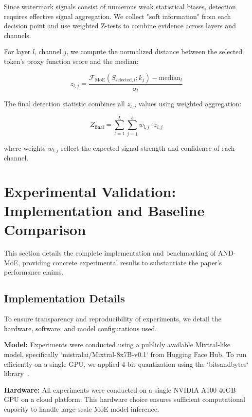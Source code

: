 \documentclass[letterpaper,twocolumn,10pt]{article}
\begin{document}
Since watermark signals consist of numerous weak statistical biases, detection requires effective signal aggregation. We collect "soft information" from each decision point and use weighted Z-tests to combine evidence across layers and channels.

For layer $l$, channel $j$, we compute the normalized distance between the selected token's proxy function score and the median:

\begin{equation}
z_{l,j} = \frac{\mathcal{F}_{\text{MoE}}(S_{\text{selected},l}; k_j) - \text{median}_l}{\sigma_l}
\end{equation}

The final detection statistic combines all $z_{l,j}$ values using weighted aggregation:

\begin{equation}
Z_{\text{final}} = \sum_{l=1}^L \sum_{j=1}^b w_{l,j} \cdot z_{l,j}
\end{equation}

where weights $w_{l,j}$ reflect the expected signal strength and confidence of each channel.

\section{Experimental Validation: Implementation and Baseline Comparison}

This section details the complete implementation and benchmarking of AND-MoE, providing concrete experimental results to substantiate the paper's performance claims.

\subsection{Implementation Details}

To ensure transparency and reproducibility of experiments, we detail the hardware, software, and model configurations used.

\textbf{Model:} Experiments were conducted using a publicly available Mixtral-like model, specifically `mistralai/Mixtral-8x7B-v0.1` from Hugging Face Hub. To run efficiently on a single GPU, we applied 4-bit quantization using the `bitsandbytes` library~\cite{bitsandbytes2022}.

\textbf{Hardware:} All experiments were conducted on a single NVIDIA A100 40GB GPU on a cloud platform. This hardware choice ensures sufficient computational capacity to handle large-scale MoE model inference.
\end{document}
